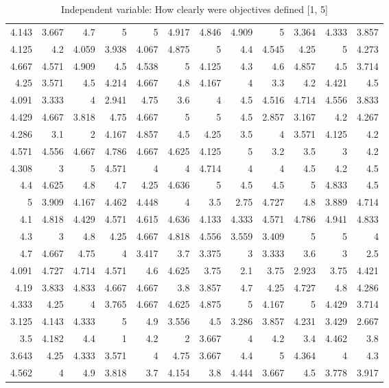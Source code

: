 \documentclass[10pt]{report}
\begin{document}
\begin{table}[!htpb]
\begin{tabular}{rrrrrrrrrrrr}
	4.143 & 3.667 & 4.7   & 5     & 5     & 4.917 & 4.846 & 4.909 & 5     & 3.364 & 4.333 & 3.857 \\
	4.125 & 4.2   & 4.059 & 3.938 & 4.067 & 4.875 & 5     & 4.4   & 4.545 & 4.25  & 5     & 4.273 \\
	4.667 & 4.571 & 4.909 & 4.5   & 4.538 & 5     & 4.125 & 4.3   & 4.6   & 4.857 & 4.5   & 3.714 \\
	4.25  & 3.571 & 4.5   & 4.214 & 4.667 & 4.8   & 4.167 & 4     & 3.3   & 4.2   & 4.421 & 4.5   \\
	4.091 & 3.333 & 4     & 2.941 & 4.75  & 3.6   & 4     & 4.5   & 4.516 & 4.714 & 4.556 & 3.833 \\
	4.429 & 4.667 & 3.818 & 4.75  & 4.667 & 5     & 5     & 4.5   & 2.857 & 3.167 & 4.2   & 4.267 \\
	4.286 & 3.1   & 2     & 4.167 & 4.857 & 4.5   & 4.25  & 3.5   & 4     & 3.571 & 4.125 & 4.2   \\
	4.571 & 4.556 & 4.667 & 4.786 & 4.667 & 4.625 & 4.125 & 5     & 3.2   & 3.5   & 3     & 4.2   \\
	4.308 & 3     & 5     & 4.571 & 4     & 4     & 4.714 & 4     & 4     & 4.5   & 4.2   & 4.5   \\
	4.4   & 4.625 & 4.8   & 4.7   & 4.25  & 4.636 & 5     & 4.5   & 4.5   & 5     & 4.833 & 4.5   \\
	5     & 3.909 & 4.167 & 4.462 & 4.448 & 4     & 3.5   & 2.75  & 4.727 & 4.8   & 3.889 & 4.714 \\
	4.1   & 4.818 & 4.429 & 4.571 & 4.615 & 4.636 & 4.133 & 4.333 & 4.571 & 4.786 & 4.941 & 4.833 \\
	4.3   & 3     & 4.8   & 4.25  & 4.667 & 4.818 & 4.556 & 3.559 & 3.409 & 5     & 5     & 4     \\
	4.7   & 4.667 & 4.75  & 4     & 3.417 & 3.7   & 3.375 & 3     & 3.333 & 3.6   & 3     & 2.5   \\
	4.091 & 4.727 & 4.714 & 4.571 & 4.6   & 4.625 & 3.75  & 2.1   & 3.75  & 2.923 & 3.75  & 4.421 \\
	4.19  & 3.833 & 4.833 & 4.667 & 4.667 & 3.8   & 3.857 & 4.7   & 4.25  & 4.727 & 4.8   & 4.286 \\
	4.333 & 4.25  & 4     & 3.765 & 4.667 & 4.625 & 4.875 & 5     & 4.167 & 5     & 4.429 & 3.714 \\
	3.125 & 4.143 & 4.333 & 5     & 4.9   & 3.556 & 4.5   & 3.286 & 3.857 & 4.231 & 3.429 & 2.667 \\
	3.5   & 4.182 & 4.4   & 1     & 4.2   & 2     & 3.667 & 4     & 4.2   & 3.4   & 4.462 & 3.8   \\
	3.643 & 4.25  & 4.333 & 3.571 & 4     & 4.75  & 3.667 & 4.4   & 5     & 4.364 & 4     & 4.3   \\
	4.562 & 4     & 4.9   & 3.818 & 3.7   & 4.154 & 3.8   & 4.444 & 3.667 & 4.5   & 3.778 & 3.917 \\
	\hline
	\end{tabular}

    \caption{Independent variable: How clearly were objectives defined [1, 5]}
\end{table}
\end{document}
